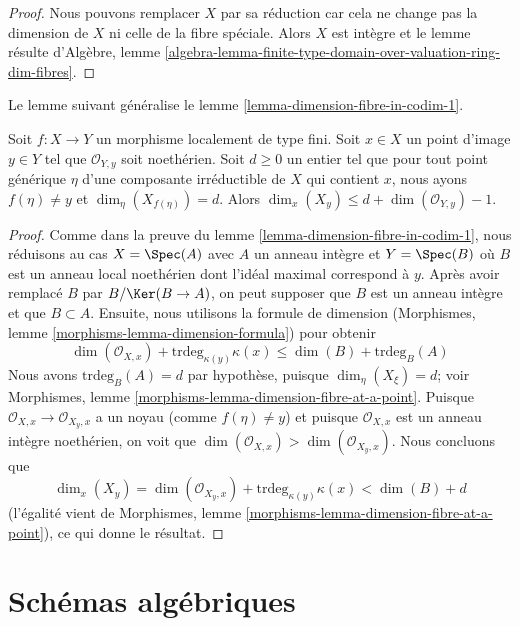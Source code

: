 \begin{proof}
Nous pouvons remplacer $X$ par sa réduction car cela ne change
pas la dimension de $X$ ni celle de la fibre spéciale. Alors
$X$ est intègre et le lemme résulte d'Algèbre, lemme
\ref{algebra-lemma-finite-type-domain-over-valuation-ring-dim-fibres}.
\end{proof}

\noindent
Le lemme suivant généralise le lemme \ref{lemma-dimension-fibre-in-codim-1}.

\begin{lemma}
\label{lemma-dimension-fibre-in-higher-codimension}
Soit $f : X \to Y$ un morphisme localement de type fini. Soit
$x \in X$ un point d'image $y \in Y$ tel que $\mathcal{O}_{Y,
y}$ soit noethérien. Soit $d \geq 0$ un entier tel que
pour tout point générique $\eta$ d'une composante irréductible de $X$
qui contient $x$, nous ayons $f(\eta) \not = y$ et
$\dim_\eta(X_{f(\eta)}) = d$. Alors $\dim_x(X_y) \leq d + \dim(\mathcal{O}_{Y, y}) - 1$.
\end{lemma}

\begin{proof}
Comme dans la preuve du lemme
\ref{lemma-dimension-fibre-in-codim-1}, nous réduisons au cas $X =
\Spec(A)$ avec $A$ un anneau intègre et $Y = \Spec(B)$ où $B$ est un anneau
local noethérien dont l'idéal maximal correspond à $y$. Après avoir
remplacé $B$ par $B/\Ker(B \to A)$, on peut supposer que $B$ est un anneau
intègre et que $B \subset A$. Ensuite, nous utilisons la formule de
dimension (Morphismes, lemme \ref{morphisms-lemma-dimension-formula}) pour obtenir
$$
\dim(\mathcal{O}_{X, x}) + \text{trdeg}_{\kappa(y)} \kappa(x) \leq
\dim(B) + \text{trdeg}_B(A)
$$
Nous avons $\text{trdeg}_B(A) = d$ par hypothèse,
puisque $\dim_\eta(X_\xi) = d$; voir
Morphismes, lemme
\ref{morphisms-lemma-dimension-fibre-at-a-point}. Puisque
$\mathcal{O}_{X, x} \to \mathcal{O}_{X_y, x}$ a un noyau
(comme $f(\eta) \not = y$) et puisque $\mathcal{O}_{X, x}$
est un anneau intègre noethérien, on voit que
$\dim(\mathcal{O}_{X, x}) > \dim(\mathcal{O}_{X_y, x})$. Nous concluons que
$$
\dim_x(X_y) =
\dim(\mathcal{O}_{X_y, x}) + \text{trdeg}_{\kappa(y)} \kappa(x)
< \dim(B) + d
$$
(l'égalité vient de Morphismes, lemme
\ref{morphisms-lemma-dimension-fibre-at-a-point}), ce qui donne le résultat.
\end{proof}




\section{Schémas algébriques}
\label{section-algebraic-schemes}

